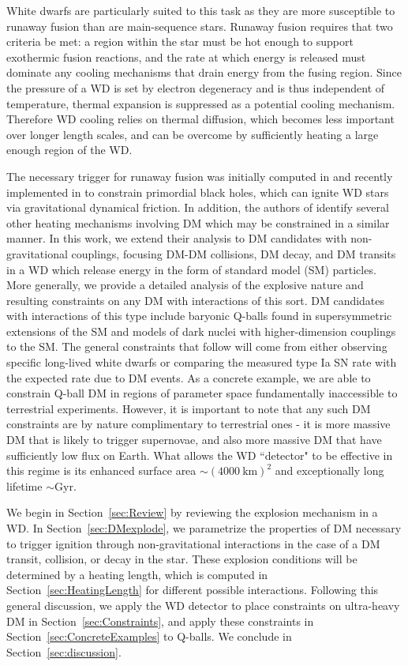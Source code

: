 \documentclass[twocolumn,showpacs,preprintnumbers,amsmath,amssymb,prd]{revtex4}
\begin{document}
White dwarfs are particularly suited to this task as they are more susceptible to runaway fusion than are main-sequence stars. Runaway fusion requires that two criteria be met: a region within the star must be hot enough to support exothermic fusion reactions, and the rate at which energy is released must dominate any cooling mechanisms that drain energy from the fusing region. Since the pressure of a WD is set by electron degeneracy and is thus independent of temperature, thermal expansion is suppressed as a potential cooling mechanism. Therefore WD cooling relies on thermal diffusion, which becomes less important over longer length scales, and can be overcome by sufficiently heating a large enough region of the WD.

The necessary trigger for runaway fusion was initially computed in \cite{Woosley} and recently implemented in \cite{Graham:2015apa} to constrain primordial black holes, which can ignite WD stars via gravitational dynamical friction.  In addition, the authors of \cite{Graham:2015apa} identify several other heating mechanisms involving DM which may be constrained in a similar manner. In this work, we extend their analysis to DM candidates with non-gravitational couplings, focusing DM-DM collisions, DM decay, and DM transits in a WD which release energy in the form of standard model (SM) particles. More generally, we provide a detailed analysis of the explosive nature and resulting constraints on any DM with interactions of this sort. DM candidates with interactions of this type include baryonic Q-balls found in supersymmetric extensions of the SM and models of dark nuclei with higher-dimension couplings to the SM. The general constraints that follow will come from either observing specific long-lived white dwarfs or comparing the measured type Ia SN rate with the expected rate due to DM events. As a concrete example, we are able to constrain Q-ball DM in regions of parameter space fundamentally inaccessible to terrestrial experiments. However, it is important to note that any such DM constraints are by nature complimentary to terrestrial ones - it is more massive DM that is likely to trigger supernovae, and also more massive DM that have sufficiently low flux on Earth. What allows the WD ``detector" to be effective in this regime is its enhanced surface area $\sim (4000 ~\text{km})^2$ and exceptionally long lifetime $\sim \text{Gyr}$. 

We begin in Section~\ref{sec:Review} by reviewing the explosion mechanism in a WD. In Section~\ref{sec:DMexplode}, we parametrize the properties of DM necessary to trigger ignition through non-gravitational interactions in the case of a DM transit, collision, or decay in the star. These explosion conditions will be determined by a heating length, which is computed in Section~\ref{sec:HeatingLength} for different possible interactions. Following this general discussion, we apply the WD detector to place constraints on ultra-heavy DM in Section~\ref{sec:Constraints}, and apply these constraints in Section~\ref{sec:ConcreteExamples} to Q-balls. We conclude in Section~\ref{sec:discussion}.
\end{document}
